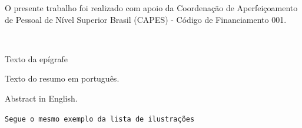 \documentclass[a4paper,12pt,oneside,onecolumn,final,fleqn]{repUERJ}
\begin{document}
O presente trabalho foi realizado com apoio da Coordenação de Aperfeiçoamento de Pessoal de Nível Superior Brasil (CAPES) - Código de Financiamento 001.

\pretextualchapter{}

  \vfill\
  \begin{flushright}
    Texto da epígrafe
  \end{flushright}


Texto do resumo em português.\\

\imprimirchaves


Abstract in English.\\

\printkeys
\listadefiguras
\listadetabelas

\texttt{Segue o mesmo exemplo da lista de ilustrações} %


\sumario
\mainmatter
\end{document}
